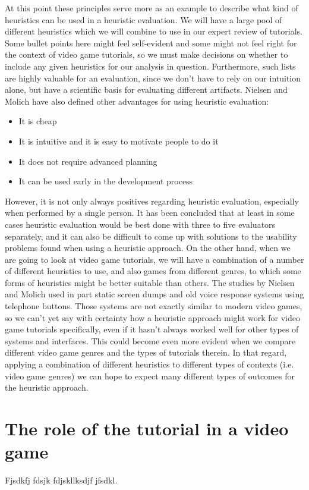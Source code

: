 At this point these principles serve more as an example to describe what kind of heuristics can be used in a heuristic evaluation. We will have a large pool of different heuristics which we will combine to use in our expert review of tutorials. Some bullet points here might feel self-evident and some might not feel right for the context of video game tutorials, so we must make decisions on whether to include any given heuristics for our analysis in question. Furthermore, such lists are highly valuable for an evaluation, since we don't have to rely on our intuition alone, but have a scientific basis for evaluating different artifacts. Nielsen and Molich have also defined other advantages for using heuristic evaluation: \cite{Nielsen1990}

\begin{itemize}
	\item It is cheap
	\item It is intuitive and it is easy to motivate people to do it
	\item It does not require advanced planning
	\item It can be used early in the development process
\end{itemize}

However, it is not only always positives regarding heuristic evaluation, especially when performed by a single person. It has been concluded that at least in some cases heuristic evaluation would be best done with three to five evaluators separately, and it can also be difficult to come up with solutions to the usability problems found when using a heuristic approach. \cite{Nielsen1990} On the other hand, when we are going to look at video game tutorials, we will have a combination of a number of different heuristics to use, and also games from different genres, to which some forms of heuristics might be better suitable than others. The studies by Nielsen and Molich used in part static screen dumps and old voice response systems using telephone buttons. Those systems are not exactly similar to modern video games, so we can't yet say with certainty how a heuristic approach might work for video game tutorials specifically, even if it hasn't always worked well for other types of systems and interfaces. This could become even more evident when we compare different video game genres and the types of tutorials therein. In that regard, applying a combination of different heuristics to different types of contexts (i.e. video game genres) we can hope to expect many different types of outcomes for the heuristic approach.

\section{The role of the tutorial in a video game}

Fjsdkfj fdsjk fdjskllksdjf jfsdkl.
